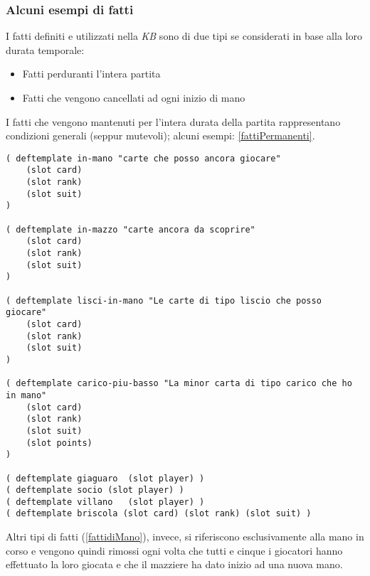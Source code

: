 \subsubsection*{Alcuni esempi di fatti}


I fatti definiti e utilizzati nella \emph{KB} sono di due tipi se considerati in base alla loro durata temporale:
\begin{itemize}
   \item Fatti perduranti l'intera partita
   \item Fatti che vengono cancellati ad ogni inizio di mano
\end{itemize}
I fatti che vengono mantenuti per l'intera durata della partita rappresentano condizioni generali (seppur mutevoli); alcuni esempi: \ref{fattiPermanenti}.



\begin{lstlisting}[caption={Alcuni template di fatti che rimangono nella \emph{KB} per l'intera partita. Il contenuto di questi fatti viene aggiornato mano a mano che nuove informazioni si rendono disponibili all'agente giocatore}, label=fattiPermanenti]
( deftemplate in-mano "carte che posso ancora giocare"
    (slot card)
    (slot rank)
    (slot suit)
)

( deftemplate in-mazzo "carte ancora da scoprire"
    (slot card)
    (slot rank)
    (slot suit)
)

( deftemplate lisci-in-mano "Le carte di tipo liscio che posso giocare"
    (slot card)
    (slot rank)
    (slot suit)
)

( deftemplate carico-piu-basso "La minor carta di tipo carico che ho in mano"
    (slot card)
    (slot rank)
    (slot suit)
    (slot points)
)

( deftemplate giaguaro  (slot player) )
( deftemplate socio (slot player) )
( deftemplate villano   (slot player) )
( deftemplate briscola (slot card) (slot rank) (slot suit) )
\end{lstlisting}




Altri tipi di fatti (\ref{fattidiMano}), invece, si riferiscono esclusivamente alla mano in corso e vengono quindi rimossi ogni volta che tutti e cinque i giocatori hanno effettuato la loro giocata e che il mazziere ha dato inizio ad una nuova mano.

